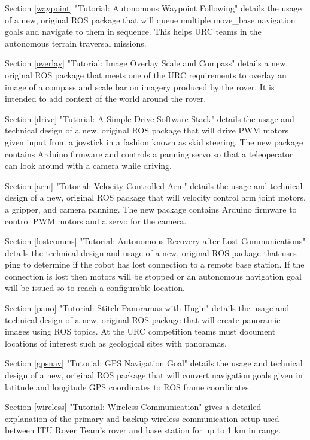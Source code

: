 \documentclass[runningheads,a4paper]{llncs}
\begin{document}
Section \ref{waypoint} "Tutorial: Autonomous Waypoint Following" details the usage of a new, original ROS package that will queue multiple move\_base navigation goals and navigate to them in sequence. This helps URC teams in the autonomous terrain traversal missions.

Section \ref{overlay} "Tutorial: Image Overlay Scale and Compass" details a new, original ROS package that meets one of the URC requirements to overlay an image of a compass and scale bar on imagery produced by the rover. It is intended to add context of the world around the rover.

Section \ref{drive} "Tutorial: A Simple Drive Software Stack" details the usage and technical design of a new, original ROS package that will drive PWM motors given input from a joystick in a fashion known as skid steering. The new package contains Arduino firmware and controls a panning servo so that a teleoperator can look around with a camera while driving.

Section \ref{arm} "Tutorial: Velocity Controlled Arm" details the usage and technical design of a new, original ROS package that will velocity control arm joint motors, a gripper, and camera panning. The new package contains Arduino firmware to control PWM motors and a servo for the camera.

Section \ref{lostcomms} "Tutorial: Autonomous Recovery after Lost Communications" details the technical design and usage of a new, original ROS package that uses ping to determine if the robot has lost connection to a remote base station. If the connection is lost then motors will be stopped or an autonomous navigation goal will be issued so to reach a configurable location. 

Section \ref{pano} "Tutorial: Stitch Panoramas with Hugin" details the usage and technical design of a new, original ROS package that will create panoramic images using ROS topics. At the URC competition teams must document locations of interest such as geological sites with panoramas.

Section \ref{gpsnav} "Tutorial: GPS Navigation Goal" details the usage and technical design of a new, original ROS package that will convert navigation goals given in latitude and longitude GPS coordinates to ROS frame coordinates.

Section \ref{wireless} "Tutorial: Wireless Communication" gives a detailed explanation of the primary and backup wireless communication setup used between ITU Rover Team's rover and base station for up to 1 km in range.
\end{document}
